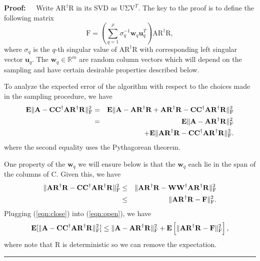 \documentclass[11pt]{article}
\newcommand{\FNormS}[1]{\mbox{}\|#1\|_\mathrm{F}^2}
\newenvironment{proof}{\begin{trivlist} \item {\bf Proof:~~}}
  {\qed\end{trivlist}}
\newcommand{\mat}[1]{{\ensuremath{\bm{\mathrm{#1}}}}}
\def\u{{\mathbf u}}
\def\matA{\mat{A}}
\def\matC{\mat{C}}
\def\matF{\mat{F}}
\def\matR{\mat{R}}
\def\matU{\mat{U}}
\def\matV{\mat{V}}
\def\matW{\mat{W}}
\def\w{{\mathbf{w}}}
\def\qed{\hfill\rule{2mm}{2mm}}
\begin{document}
\begin{proof}
Write $\matA\matR^{\dagger} \matR$ in its SVD as $\matU \mat\Sigma \matV^T$. 
The key to the proof is to define the following matrix
$$\matF = \left (\sum_{q=1}^{\rho} \sigma_q^{-1} \w_q \u_q^T \right )\matA\matR^{\dagger} \matR,$$
where $\sigma_q$ is the $q$-th singular value of $\matA\matR^{\dagger} \matR$ with corresponding
left singular vector $\u_q$. The $\w_q \in \mathbb{R}^m$ are random
column vectors which will depend on the sampling and have certain desirable properties described
below.  

To analyze the expected error of the algorithm with respect to the choices made in the sampling
procedure, we have
\begin{eqnarray}\label{eqn:open}
{\bf E}\FNormS{\matA-\matC\matC^{\dagger}\matA\matR^{\dagger} \matR}
& = & {\bf E} \FNormS{\matA-\matA\matR^{\dagger} \matR + \matA\matR^{\dagger}\matR - \matC\matC^{\dagger}\matA\matR^{\dagger}\matR} \notag \\
& = & {\bf E} \FNormS{\matA-\matA\matR^{\dagger} \matR} \notag \\
&& + {\bf E} \FNormS{\matA\matR^{\dagger}\matR-\matC\matC^{\dagger}\matA\matR^{\dagger}\matR}.
\end{eqnarray}
where the second equality uses the Pythagorean theorem. 

One property of the $\w_q$ we will ensure below is that the $\w_q$ each lie in the span of the columns
of $\matC$. Given this, we have
\begin{eqnarray}\label{eqn:close}
\FNormS{\matA\matR^{\dagger}\matR-\matC\matC^{\dagger}\matA\matR^{\dagger}\matR} 
& \leq & \FNormS{\matA\matR^{\dagger} \matR - \matW\matW^{\dagger}\matA\matR^{\dagger} \matR} \notag \\
& \leq & \FNormS{\matA\matR^{\dagger} \matR - \matF}. 
\end{eqnarray}
Plugging (\ref{eqn:close}) into (\ref{eqn:open}), we have
\begin{eqnarray}\label{eqn:combined}
{\bf E}[\FNormS{\matA-\matC\matC^{\dagger}\matA\matR^{\dagger} \matR}] 
\leq \FNormS{\matA-\matA\matR^{\dagger}\matR} + {\bf E}\left [\FNormS{\matA\matR^{\dagger} \matR - \matF} \right ],
\end{eqnarray}
where note that $\matR$ is deterministic so we can remove the expectation. 


\end{proof}
\end{document}
